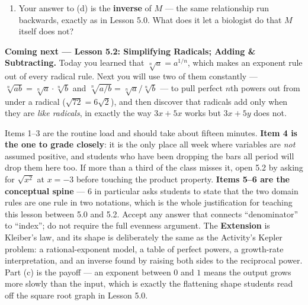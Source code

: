 \documentclass[10pt]{article}
\begin{document}
\begin{extensionbox}
\begin{enumerate}[label=(\alph*), leftmargin=1.8em, itemsep=5pt]
{        $\left(w^{3/4}\right)^{4/3}=w^{1}=w$. So $w=\left(\dfrac{M}{70}\right)^{4/3}$.}
  \item Your answer to (d) is the \textbf{inverse} of $M$ --- the same relationship run backwards,
        exactly as in Lesson 5.0. What does it let a biologist do that $M$ itself does not?
\end{enumerate}
\end{extensionbox}

\begin{spiralbox}
\textbf{Coming next --- Lesson 5.2: Simplifying Radicals; Adding \& Subtracting.} Today you learned
that $\sqrt[n]{a}=a^{1/n}$, which makes an exponent rule out of every radical rule. Next you will use
two of them constantly --- $\sqrt[n]{ab}=\sqrt[n]{a}\cdot\sqrt[n]{b}$ and
$\sqrt[n]{a/b}=\sqrt[n]{a}\big/\sqrt[n]{b}$ --- to pull perfect $n$th powers out from under a
radical ($\sqrt{72}=6\sqrt{2}$), and then discover that radicals add only when they are
\emph{like radicals}, in exactly the way $3x+5x$ works but $3x+5y$ does not.
\end{spiralbox}

\begin{teachernote}
Items 1--3 are the routine load and should take about fifteen minutes. \textbf{Item 4 is the one to
grade closely}: it is the only place all week where variables are \emph{not} assumed positive, and
students who have been dropping the bars all period will drop them here too. If more than a third of
the class misses it, open 5.2 by asking for $\sqrt{x^{2}}$ at $x=-3$ before touching the product
property. \textbf{Items 5--6 are the conceptual spine} --- 6 in particular asks students to state
that the two domain rules are one rule in two notations, which is the whole justification for
teaching this lesson between 5.0 and 5.2. Accept any answer that connects ``denominator'' to
``index''; do not require the full evenness argument.
The \textbf{Extension} is Kleiber's law, and its shape is deliberately the same as the Activity's
Kepler problem: a rational-exponent model, a table of perfect powers, a growth-rate interpretation,
and an inverse found by raising both sides to the reciprocal power. Part (c) is the payoff --- an
exponent between $0$ and $1$ means the output grows more slowly than the input, which is exactly the
flattening shape students read off the square root graph in Lesson 5.0.
\end{teachernote}
\end{document}
